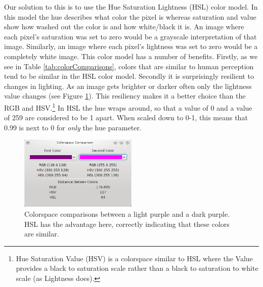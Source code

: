 \documentclass{article}
\renewcommand{\|}{\origbar} %
\begin{document}
Our solution to this is to use the Hue Saturation Lightness (HSL) color model. In this model the hue describes what color the pixel is whereas saturation and value show how washed out the color is and how white/black it is. An image where each pixel's saturation was set to zero would be a grayscale interpretation of that image. Similarly, an image where each pixel's lightness was set to zero would be a completely white image. This color model has a number of benefits. Firstly, as we see in Table \ref{tab:colorComparisons}, colors that are similar to human perception tend to be similar in the HSL color model. Secondly it is surprisingly resilient to changes in lighting. As an image gets brighter or darker often only the lightness value changes (see Figure \ref{fig:colorspaceComparison}). This resiliency makes it a better choice than the RGB and HSV.\footnote{Hue Saturation Value (HSV) is a colorspace similar to HSL where the Value provides a black to saturation scale rather than a black to saturation to white scale (as Lightness does).} In HSL the hue wraps around, so that a value of 0 and a value of 259 are considered to be 1 apart. When scaled down to 0-1, this means that 0.99 is next to 0 for {\em only} the hue parameter.

\begin{figure}[h!]
  \begin{center}
    \includegraphics[width=0.5\textwidth]{colorspace_comparison_application.png}
  \end{center}
  \caption{Colorspace comparisons between a light purple and a dark purple. HSL has the advantage here, correctly indicating that these colors are similar.}
  \label{fig:colorspaceComparison}
\end{figure}
\end{document}
